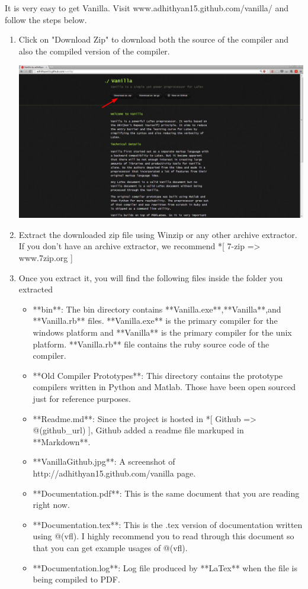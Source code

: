 \documentclass{article}
\begin{document}
It is very easy to get Vanilla. Visit www.adhithyan15.github.com/vanilla/ and follow the steps below. 

\begin{enumerate}

\item Click on "Download Zip" to download both the source of the compiler and also the compiled version of the compiler. \vspace{5pt}

\includegraphics[scale = 0.35]{VanillaGithub}

\item Extract the downloaded zip file using Winzip or any other archive extractor. If you don't have an archive extractor, we recommend *[ 7-zip => www.7zip.org ]

\item Once you extract it, you will find the following files inside the folder you extracted

\begin{itemize}

\item **bin**: The bin directory contains **Vanilla.exe**,**Vanilla**,and **Vanilla.rb** files. **Vanilla.exe** is the primary compiler for the windows platform and **Vanilla** is the primary compiler for the unix platform. **Vanilla.rb** file contains the ruby source code of the compiler. 
\item **Old Compiler Prototypes**: This directory contains the prototype compilers written in Python and Matlab. Those have been open sourced just for reference purposes. 
\item **Readme.md**: Since the project is hosted in *[ Github => @(github_url) ], Github added a readme file markuped in **Markdown**.
\item **VanillaGithub.jpg**: A screenshot of http://adhithyan15.github.com/vanilla page. 
\item **Documentation.pdf**: This is the same document that you are reading right now. 
\item **Documentation.tex**: This is the .tex version of documentation written using @(vfl). I highly recommend you to read through this document so that you can get example usages of @(vfl).
\item **Documentation.log**: Log file produced by **LaTex** when the file is being compiled to PDF.  


\end{itemize}
\end{enumerate}
\end{document}

